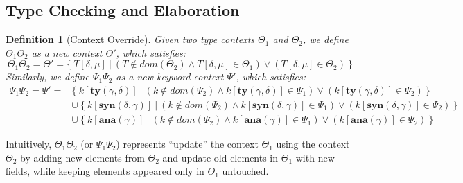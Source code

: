 \documentclass[letterpaper, notitlepage]{article}
\newcommand{\flyingbox}[1]{\begin{flushleft}\fbox{{#1}}\end{flushleft}}
\newcommand{\myvdash}{\vdash_{\Theta}^{\Psi}}
\newtheorem{definition}{Definition}
\begin{document}
\subsection{Type Checking and Elaboration}
\begin{definition}[Context Override]Given two type contexts $\Theta_1$ and $\Theta_2$, we define $\Theta_1\Theta_2$ as a new context $\Theta'$, which satisfies:
\[
	\Theta_1\Theta_2 = \Theta' = \{~T[\delta,\mu]~|~ (T\notin dom(\Theta_2)\land T[\delta,\mu]\in\Theta_1)\lor(T[\delta,\mu]\in\Theta_2) ~\}
\]
Similarly, we define $\Psi_1\Psi_2$ as a new keyword context $\Psi'$, which satisfies:
\[
	\begin{array}{rl}
	\Psi_1\Psi_2=\Psi'=&\{~k[\mathbf{ty}(\gamma,\delta)]~|~ (k\notin dom(\Psi_2) \land k[\mathbf{ty}(\gamma,\delta)]\in\Psi_1)\lor(k[\mathbf{ty}(\gamma,\delta)]\in\Psi_2)  ~\}\\
							 &\cup~\{~k[\mathbf{syn}(\delta,\gamma)]~|~ (k\notin dom(\Psi_2) \land k[\mathbf{syn}(\delta,\gamma)]\in\Psi_1) \lor(k[\mathbf{syn}(\delta,\gamma)]\in\Psi_2)  ~\}\\
							 &\cup~\{~k[\mathbf{ana}(\gamma)]~|~ (k\notin dom(\Psi_2) \land k[\mathbf{ana}(\gamma)]\in\Psi_1) \lor(k[\mathbf{ana}(\gamma)]\in\Psi_2)  ~\}
	\end{array}
\]
\end{definition}
Intuitively, $\Theta_1\Theta_2$ (or $\Psi_1\Psi_2$) represents ``update'' the context $\Theta_1$ using the context $\Theta_2$ by adding new elements from $\Theta_2$ and update old elements in $\Theta_1$ with new fields, while keeping elements appeared only in $\Theta_1$ untouched.

\flyingbox{$\rho \sim (\Psi;\Theta)\rightsquigarrow i:\tau$}
\begin{center}
      
\DP
\end{center}

\flyingbox{$\Delta{\myvdash}\theta\sim (\Psi;\Theta)$}
\begin{center}
 
\DP
\end{center}
\end{document}
